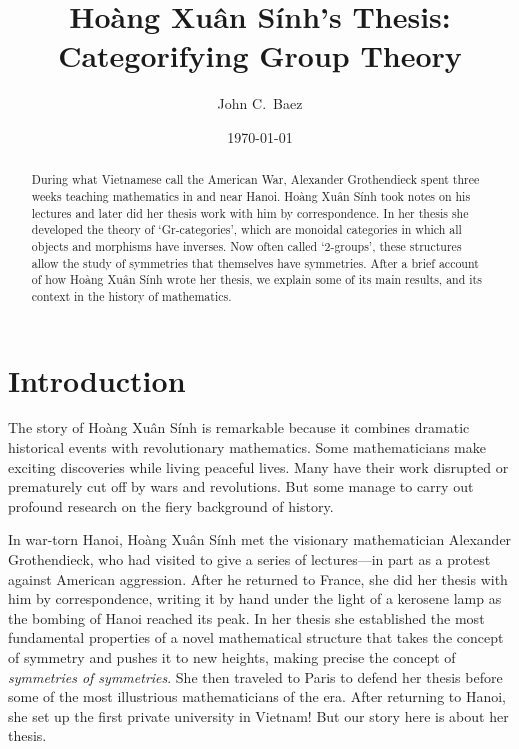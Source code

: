 \documentclass[reqno]{amsart}
\theoremstyle{definition}
\begin{document}
\title{Ho\`ang Xu\^an S\'inh's Thesis: \\ Categorifying Group Theory}
\author[Baez]{John C.\ Baez} 
\address{Department of Mathematics, University of California, Riverside CA, 92521, USA}
\address{Centre for Quantum Technologies, National University of Singapore, 117543, Singapore}
\date{\today}
\maketitle

\begin{abstract}
During what Vietnamese call the American War, Alexander Grothendieck spent three weeks teaching mathematics in and near Hanoi.  Ho\`ang Xu\^an S\'inh took notes on his lectures and later did her thesis work with him by correspondence.  In her thesis she developed the theory of `Gr-categories', which are monoidal categories in which all objects and morphisms have inverses.   Now often called `2-groups', these structures allow the study of symmetries that themselves have symmetries. After a brief account of how Ho\`ang Xu\^an S\'inh wrote her thesis, we explain some of its main results, and its context in the history of mathematics.
\end{abstract}


\section{Introduction}

The story of Ho\`ang Xu\^an S\'inh is remarkable because it combines dramatic historical events with revolutionary mathematics.  Some mathematicians make exciting discoveries while living peaceful lives.  Many have their work disrupted or prematurely cut off by wars and revolutions.  But some manage to carry out profound research on the fiery background of  history.

In war-torn Hanoi, Ho\`ang Xu\^an S\'inh met the visionary mathematician Alexander Grothendieck, who had visited to give a series of lectures---in part as a protest against American aggression.  After he returned to France, she did her thesis with him by correspondence, writing it by hand under the light of a kerosene lamp as the bombing of Hanoi reached its peak.  In her thesis she established the most fundamental properties of a novel mathematical structure that takes the concept of symmetry and pushes it to new heights, making precise the concept of \emph{symmetries of symmetries}.   She then traveled to Paris to defend her thesis before some of the most illustrious mathematicians of the era.   After returning to Hanoi, she set up the first private university in Vietnam!   But our story here is about her thesis.
\end{document}
